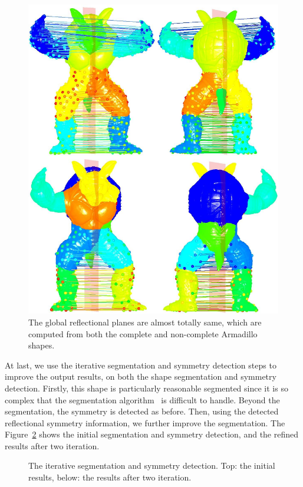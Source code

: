 \begin{figure}[t]
\centering
  \includegraphics[width=0.99\linewidth]{figures/Armadillo.pdf}
  \caption{The global reflectional planes are almost totally same, which are computed from both the complete and non-complete Armadillo shapes.}
\label{fig:Arm}
\end{figure}

At last, we use the iterative segmentation and symmetry detection steps to improve the output results, on both the shape segmentation and symmetry detection. 
Firstly, this shape is particularly reasonable segmented since it is so complex that the segmentation algorithm~\cite{lai2009} is difficult to handle.
Beyond the segmentation, the symmetry is detected as before. Then, using the detected reflectional symmetry information, we further improve the segmentation.
The Figure~\ref{fig:iteration} shows the initial segmentation and symmetry detection, and the refined results after two iteration.

\begin{figure}[t]
\centering
  \caption{The iterative segmentation and symmetry detection. Top: the initial results, below: the results after two iteration.}
\label{fig:iteration}
\end{figure}

